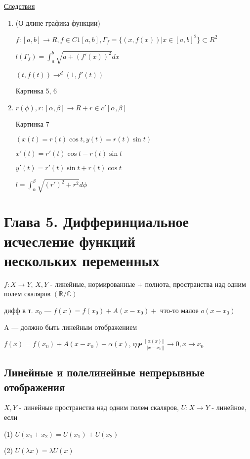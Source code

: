 \underline{Следствия}

\begin{enumerate}
    \item (О длине графика функции)
    
    $f : [a, b] \to R, f \in C1[a, b], \Gamma_f = \{(x, f(x)) | x \in [a, b]^2\} \subset R^2$

    $l(\Gamma_f) = \int_a^{b}\sqrt{a + (f'(x))^2} dx$

    $(t, f(t)) \to^{d} (1, f'(t))$

    Картинка 5, 6

    \item $r(\phi), r : [\alpha, \beta] \to R+ r \in c'[\alpha, \beta]$
    
    Картинка 7

    $(x(t) = r(t)\cos{t}, y(t) = r(t)\sin{t})$

    $x'(t) = r'(t)\cos{t} - r(t) \sin{t}$

    $y'(t) = r'(t)\sin{t} + r(t)\cos{t}$

    $l = \int_\alpha^\beta \sqrt{(r')^2 + r^2} d\phi$
\end{enumerate}


\newpage
\section{Глава 5. Дифферинциальное исчесление функций \\ нескольких переменных}

$f : X \to Y$, $X, Y$ - линейные, нормированные + полнота, пространства над одним полем скаляров $(\mathbb{R}  / \mathbb{C})$


дифф в т. $x_0$ --- 
$f(x) = f(x_0) + A(x - x_0) + $ что-то малое $o(x - x_0)$

A --- должно быть линейным отображением

$f(x) = f(x_0) + A(x - x_0) + \alpha(x)$, где 
$\frac{||\alpha(x)||}{||x - x_0||} \to 0, x \to x_0 $


\subsection{Линейные и полелинейные непрерывные отображения}

\begin{definition}
    $X, Y$ - линейные пространства над одним полем скаляров, $U : X \to Y$ - линейное, если 

    (1) $U(x_1 + x_2) = U(x_1) + U(x_2)$

    (2) $U(\lambda x) = \lambda U(x)$
\end{definition}

